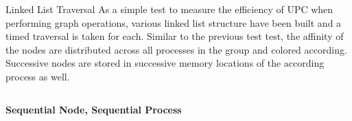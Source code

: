 \documentclass[final]{beamer}
\begin{document}
\begin{frame}[t]
\begin{columns}[t]
\begin{column}{0.60\paperwidth}



  


				\begin{block}{Linked List Traversal}
					As a simple test to measure the efficiency of UPC when performing graph operations, various linked list structure have been built and a timed traversal is taken for each.  Similar to the previous test test, the affinity of the nodes are distributed across all processes in the group and colored according.  Successive nodes are stored in successive memory locations of the according process as well.  
				\end{block}
				\begin{columns}[t,totalwidth=0.60\paperwidth]
					\begin{column}{0.28\paperwidth}
						\begin{center} \bf{Sequential Node, Sequential Process} \end{center}
						\begin{columns}[t,totalwidth=0.28\paperwidth]
							\begin{column}{0.12\paperwidth}

\end{column}
\end{columns}
\end{column}
\end{columns}
\end{column}
\end{columns}
\end{frame}
\end{document}
